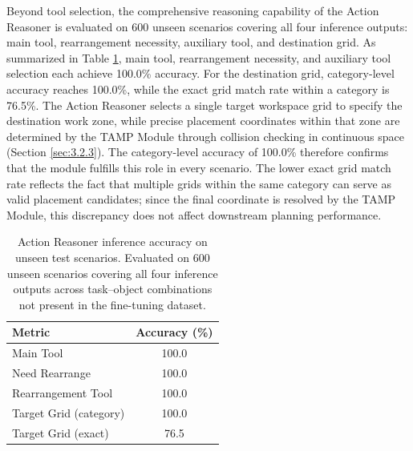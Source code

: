 \documentclass{ieeeaccess}
\begin{document}
Beyond tool selection, the comprehensive reasoning capability of the Action Reasoner is evaluated on 600 unseen scenarios covering all four inference outputs: main tool, rearrangement necessity, auxiliary tool, and destination grid. As summarized in Table \ref{tab:action_reasoner}, main tool, rearrangement necessity, and auxiliary tool selection each achieve 100.0\% accuracy. For the destination grid, category-level accuracy reaches 100.0\%, while the exact grid match rate within a category is 76.5\%. The Action Reasoner selects a single target workspace grid to specify the destination work zone, while precise placement coordinates within that zone are determined by the TAMP Module through collision checking in continuous space (Section \ref{sec:3.2.3}). The category-level accuracy of 100.0\% therefore confirms that the module fulfills this role in every scenario. The lower exact grid match rate reflects the fact that multiple grids within the same category can serve as valid placement candidates; since the final coordinate is resolved by the TAMP Module, this discrepancy does not affect downstream planning performance.

\begin{table}[t]
\centering
\caption{Action Reasoner inference accuracy on unseen test scenarios. Evaluated on 600 unseen scenarios covering all four inference outputs across task--object combinations not present in the fine-tuning dataset.}\label{tab:action_reasoner}
\begin{tabular*}{\linewidth}{@{\extracolsep{\fill}}lc@{}}
\toprule
Metric & Accuracy (\%) \\
\midrule
Main Tool & 100.0 \\
Need Rearrange & 100.0 \\
Rearrangement Tool & 100.0 \\
Target Grid (category) & 100.0 \\
Target Grid (exact) & 76.5 \\
\bottomrule
\end{tabular*}
\end{table}
\end{document}
